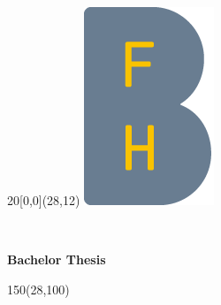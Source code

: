 %
%

\begin{titlepage}


\setlength{\unitlength}{1mm}
\begin{textblock}{20}[0,0](28,12)
	\includegraphics[scale=1.0]{images/BFH_Logo_B.png}
\end{textblock}

\begin{flushleft}

\vspace*{21mm}

\fontsize{26pt}{40pt}\selectfont 
\heading				\\							%
\vspace{2mm}

\fontsize{16pt}{24pt}\selectfont\vspace{0.3em}
\vspace{5mm}

\fontsize{10pt}{12pt}\selectfont
\textbf{Bachelor Thesis} \\		%
\vspace{7mm}

\begin{textblock}{150}(28,100)
\end{textblock}


\end{flushleft}
\end{titlepage}
